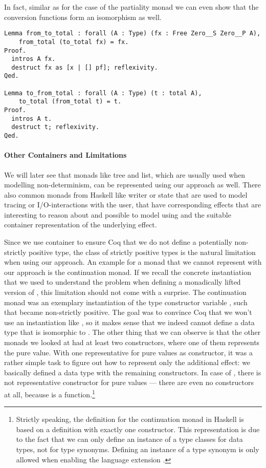 \noindent
In fact, similar as for the case of the partiality monad we can even
show that the conversion functions form an isomorphism as well.

\begin{verbatim}
Lemma from_to_total : forall (A : Type) (fx : Free Zero__S Zero__P A),
    from_total (to_total fx) = fx.
Proof.
  intros A fx.
  destruct fx as [x | [] pf]; reflexivity.
Qed.

Lemma to_from_total : forall (A : Type) (t : total A),
    to_total (from_total t) = t.
Proof.
  intros A t.
  destruct t; reflexivity.
Qed.
\end{verbatim}

\paragraph{Other Containers and Limitations}

We will later see that monads like tree and list, which are usually
used when modelling non-determinism, can be represented using our
approach as well.
There also common monads from Haskell like writer or state that are
used to model tracing or I/O-interactions with the user, that have
corresponding effects that are interesting to reason about and
possible to model using  and the suitable container
representation of the underlying effect.

Since we use container to ensure Coq that we do not define a
potentially non-strictly positive type, the class of strictly positive
types is the natural limitation when using our approach.
An example for a monad that we cannot represent with our approach is
the continuation monad.
If we recall the concrete instantiation that we used to understand the
problem when defining a monadically lifted version of ,
this limitation should not come with a surprise.
The continuation monad  was an exemplary instantiation of
the type constructor variable , such that  became
non-strictly positive.
The goal was to convince Coq that we won't use an instantiation like
, so it makes sense that we indeed cannot define a data
type that is isomorphic to . 
The other thing that we can observe is that the other monads we looked
at had at least two constructors, where one of them represents the
pure value.
With one representative for pure values as constructor, it was a
rather simple task to figure out how to represent only the additional
effect: we basically defined a data type with the remaining
constructors.
In case of , there is not representative constructor for
pure values --- there are even no constructors at all, because
 is a function.\footnote{Strictly speaking, the definition
  for the continuation monad in Haskell is based on a 
  definition with exactly one constructor. This representation is due
  to the fact that we can only define an instance of a type classes
  for data types, not for type synonyms. Defining an instance of a type
synonym is only allowed when enabling the language extension
.}


